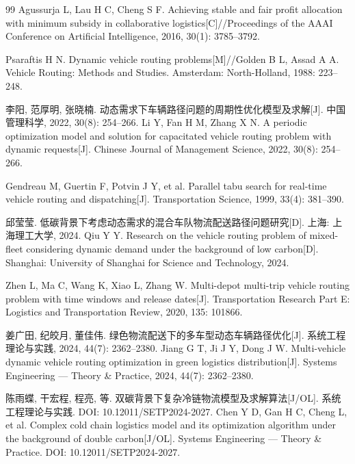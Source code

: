 \documentclass{setp-new}
\begin{document}
\begin{thebibliography}{99}
 Agussurja L, Lau H C, Cheng S F. Achieving stable and fair profit allocation with minimum subsidy in collaborative logistics[C]//Proceedings of the AAAI Conference on Artificial Intelligence, 2016, 30(1): 3785--3792.

 Psaraftis H N. Dynamic vehicle routing problems[M]//Golden B L, Assad A A. Vehicle Routing: Methods and Studies. Amsterdam: North-Holland, 1988: 223--248.

 李阳, 范厚明, 张晓楠. 动态需求下车辆路径问题的周期性优化模型及求解[J]. 中国管理科学, 2022, 30(8): 254--266.\newline
Li Y, Fan H M, Zhang X N. A periodic optimization model and solution for capacitated vehicle routing problem with dynamic requests[J]. Chinese Journal of Management Science, 2022, 30(8): 254--266.

 Gendreau M, Guertin F, Potvin J Y, et al. Parallel tabu search for real-time vehicle routing and dispatching[J]. Transportation Science, 1999, 33(4): 381--390.

 邱莹莹. 低碳背景下考虑动态需求的混合车队物流配送路径问题研究[D]. 上海: 上海理工大学, 2024.\newline
Qiu Y Y. Research on the vehicle routing problem of mixed-fleet considering dynamic demand under the background of low carbon[D]. Shanghai: University of Shanghai for Science and Technology, 2024.

 Zhen L, Ma C, Wang K, Xiao L, Zhang W. Multi-depot multi-trip vehicle routing problem with time windows and release dates[J]. Transportation Research Part E: Logistics and Transportation Review, 2020, 135: 101866.

 姜广田, 纪皎月, 董佳伟. 绿色物流配送下的多车型动态车辆路径优化[J]. 系统工程理论与实践, 2024, 44(7): 2362--2380.\newline
Jiang G T, Ji J Y, Dong J W. Multi-vehicle dynamic vehicle routing optimization in green logistics distribution[J]. Systems Engineering --- Theory \& Practice, 2024, 44(7): 2362--2380.

 陈雨蝶, 干宏程, 程亮, 等. 双碳背景下复杂冷链物流模型及求解算法[J/OL]. 系统工程理论与实践. DOI: 10.12011/SETP2024-2027.\newline
Chen Y D, Gan H C, Cheng L, et al. Complex cold chain logistics model and its optimization algorithm under the background of double carbon[J/OL]. Systems Engineering --- Theory \& Practice. DOI: 10.12011/SETP2024-2027.


\end{thebibliography}
\end{document}
